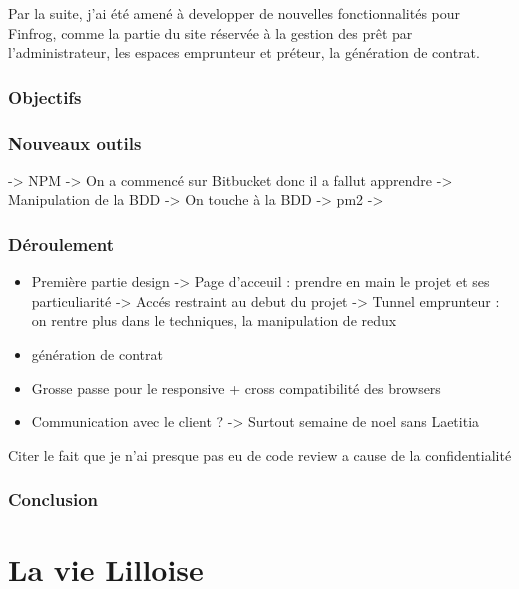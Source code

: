 \bigskip

Par la suite, j'ai été amené à developper de nouvelles fonctionnalités
pour Finfrog, comme la partie du site réservée à la gestion des prêt par
l'administrateur, les espaces emprunteur et préteur, la génération de
contrat.

\subsubsection{Objectifs}\label{objectifs-1}

\subsubsection{Nouveaux outils}\label{nouveaux-outils}

-\textgreater{} NPM -\textgreater{} On a commencé sur Bitbucket donc il
a fallut apprendre -\textgreater{} Manipulation de la BDD
-\textgreater{} On touche à la BDD -\textgreater{} pm2 -\textgreater{}

\subsubsection{Déroulement}\label{duxe9roulement-1}

\begin{itemize}
\item
  Première partie design -\textgreater{} Page d'acceuil : prendre en
  main le projet et ses particuliarité -\textgreater{} Accés restraint
  au debut du projet -\textgreater{} Tunnel emprunteur : on rentre plus
  dans le techniques, la manipulation de redux
\item
  génération de contrat
\item
  Grosse passe pour le responsive + cross compatibilité des browsers
\item
  Communication avec le client ? -\textgreater{} Surtout semaine de noel
  sans Laetitia
\end{itemize}

Citer le fait que je n'ai presque pas eu de code review a cause de la
confidentialité

\subsubsection{Conclusion}\label{conclusion-1}

\newpage

\section{La vie Lilloise}\label{la-vie-lilloise}

